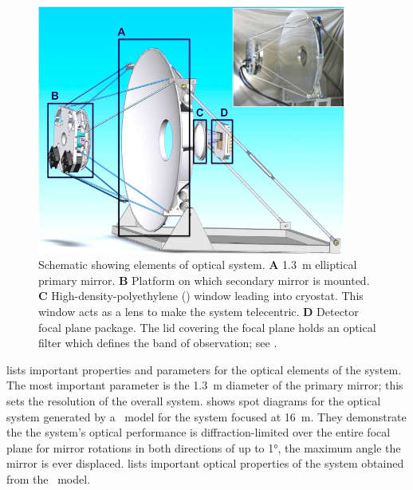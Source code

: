 \begin{figure}
\centering
\includegraphics[width=4in]{images/optics-labeled-fixed.jpg}
\caption{
Schematic showing elements of optical system.
\textbf{A} \SI{1.3}{\m} elliptical primary mirror.
\textbf{B} Platform on which secondary mirror is mounted.
\textbf{C} High-density-polyethylene (\HDPE) window leading into cryostat.
           This window acts as a lens to make the system telecentric.
\textbf{D} Detector focal plane package.
           The lid covering the focal plane holds an optical filter which defines the band of observation; see .
}
\label{fig:ch4-optical-schematic}
\end{figure}

 lists important properties and parameters for the optical elements of the system.
The most important parameter is the \SI{1.3}{\m} diameter of the primary mirror; this sets the resolution of the overall system.
 shows spot diagrams for the optical system generated by a \ZEMAX\ model for the system focused at \SI{16}{\m}.
They demonstrate the the system's optical performance is diffraction-limited over the entire focal plane for mirror rotations in both directions of up to \ang{1}, the maximum angle the mirror is ever displaced.
 lists important optical properties of the system obtained from the \ZEMAX\ model.


